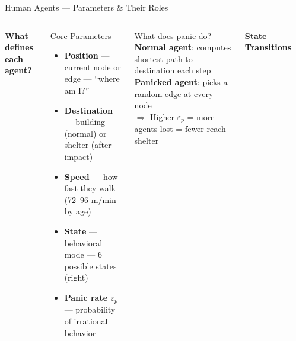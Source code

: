 \documentclass[aspectratio=169, xcolor=table]{beamer}
\newcommand{\parambox}[2]{\textcolor{highlightblue}{\textbf{#1}} {\scriptsize--- #2}}
\begin{document}
\begin{frame}[t,shrink=8]{Human Agents --- Parameters \& Their Roles}
\footnotesize

\begin{columns}[T,onlytextwidth]
\textbf{What defines each agent?}
\vspace{0.2em}

\begin{block}{\scriptsize Core Parameters}
\scriptsize
\begin{itemize}\itemsep0.25em
  \item \parambox{Position}{current node or edge --- ``where am I?''}
  \item \parambox{Destination}{building (normal) or shelter (after impact)}
  \item \parambox{Speed}{how fast they walk (72--96 m/min by age)}
  \item \parambox{State}{behavioral mode --- 6 possible states (right)}
  \item \parambox{Panic rate $\varepsilon_p$}{probability of irrational behavior}
\end{itemize}
\end{block}

\vspace{0.2em}
\begin{alertblock}{\scriptsize What does panic do?}
\scriptsize
\textbf{Normal agent}: computes shortest path to destination each step\\
\textbf{Panicked agent}: picks a \textcolor{highlightred}{random edge} at every node\\[3pt]
$\Rightarrow$ Higher $\varepsilon_p$ = more agents lost = fewer reach shelter
\end{alertblock}

\textbf{State Transitions}
\vspace{0.1em}

\begin{center}
\end{center}
\end{columns}
\end{frame}
\end{document}
